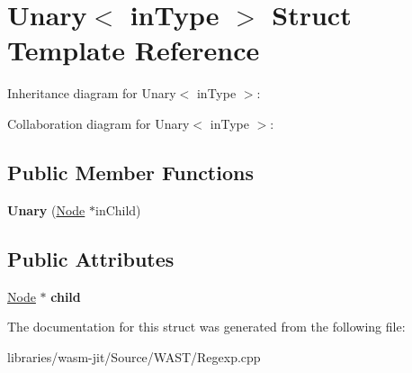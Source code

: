 \hypertarget{struct_unary}{}\section{Unary$<$ in\+Type $>$ Struct Template Reference}
\label{struct_unary}


Inheritance diagram for Unary$<$ in\+Type $>$\+:


Collaboration diagram for Unary$<$ in\+Type $>$\+:
\subsection*{Public Member Functions}
\begin{DoxyCompactItemize}
\item 
\mbox{\label{struct_unary_a91fab4dda925a78db5f4594001be6c40}} 
{\bfseries Unary} (\mbox{\hyperlink{struct_node}{Node}} $\ast$in\+Child)
\end{DoxyCompactItemize}
\subsection*{Public Attributes}
\begin{DoxyCompactItemize}
\item 
\mbox{\label{struct_unary_a686d6e1f001fafa426689eedaee3b070}} 
\mbox{\hyperlink{struct_node}{Node}} $\ast$ {\bfseries child}
\end{DoxyCompactItemize}


The documentation for this struct was generated from the following file\+:\begin{DoxyCompactItemize}
\item 
libraries/wasm-\/jit/\+Source/\+W\+A\+S\+T/Regexp.\+cpp\end{DoxyCompactItemize}
